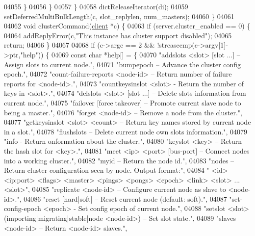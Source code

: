 \begin{DoxyCode}
{{{{{{{{{{{{{{{{{{{{{{{{{{{{{{{{{{{{{{{{{{{{{{{{{{{{{{{{{{{{{{{{{{{{{{{04055             \}
04056         \}
04057     \}
04058     dictReleaseIterator(di);
04059     setDeferredMultiBulkLength(c, slot\_replylen, num\_masters);
04060 \}
04061 
04062 \textcolor{keywordtype}{void} clusterCommand(\hyperlink{structclient}{client} *c) \{
04063     \textcolor{keywordflow}{if} (server.cluster\_enabled == 0) \{
04064         addReplyError(c,\textcolor{stringliteral}{"This instance has cluster support disabled"});
04065         \textcolor{keywordflow}{return};
04066     \}
04067 
04068     \textcolor{keywordflow}{if} (c->argc == 2 && !strcasecmp(c->argv[1]->ptr,\textcolor{stringliteral}{"help"})) \{
04069         \textcolor{keyword}{const} \textcolor{keywordtype}{char} *help[] = \{
04070 \textcolor{stringliteral}{"addslots <slot> [slot ...] -- Assign slots to current node."},
04071 \textcolor{stringliteral}{"bumpepoch -- Advance the cluster config epoch."},
04072 \textcolor{stringliteral}{"count-failure-reports <node-id> -- Return number of failure reports for <node-id>."},
04073 \textcolor{stringliteral}{"countkeysinslot <slot> - Return the number of keys in <slot>."},
04074 \textcolor{stringliteral}{"delslots <slot> [slot ...] -- Delete slots information from current node."},
04075 \textcolor{stringliteral}{"failover [force|takeover] -- Promote current slave node to being a master."},
04076 \textcolor{stringliteral}{"forget <node-id> -- Remove a node from the cluster."},
04077 \textcolor{stringliteral}{"getkeysinslot <slot> <count> -- Return key names stored by current node in a slot."},
04078 \textcolor{stringliteral}{"flushslots -- Delete current node own slots information."},
04079 \textcolor{stringliteral}{"info - Return onformation about the cluster."},
04080 \textcolor{stringliteral}{"keyslot <key> -- Return the hash slot for <key>."},
04081 \textcolor{stringliteral}{"meet <ip> <port> [bus-port] -- Connect nodes into a working cluster."},
04082 \textcolor{stringliteral}{"myid -- Return the node id."},
04083 \textcolor{stringliteral}{"nodes -- Return cluster configuration seen by node. Output format:"},
04084 \textcolor{stringliteral}{"    <id> <ip:port> <flags> <master> <pings> <pongs> <epoch> <link> <slot> ... <slot>"},
04085 \textcolor{stringliteral}{"replicate <node-id> -- Configure current node as slave to <node-id>."},
04086 \textcolor{stringliteral}{"reset [hard|soft] -- Reset current node (default: soft)."},
04087 \textcolor{stringliteral}{"set-config-epoch <epoch> - Set config epoch of current node."},
04088 \textcolor{stringliteral}{"setslot <slot> (importing|migrating|stable|node <node-id>) -- Set slot state."},
04089 \textcolor{stringliteral}{"slaves <node-id> -- Return <node-id> slaves."},
}}}}}}}}}}}}}}}}}}}}}}}}}}}}}}}}}}}}}}}}}}}}}}}}}}}}}}}}}}}}}}}}}}}}}}}
\end{DoxyCode}

